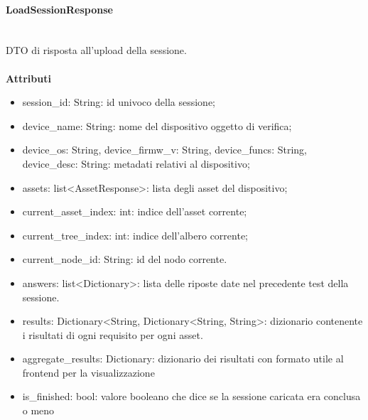 \documentclass[a4paper,12pt]{article}
\begin{document}
                \paragraph{LoadSessionResponse}\mbox{}\\
                    DTO di risposta all'upload della sessione.\\\\
                    \textbf{Attributi}
                    \begin{itemize}
                        \item {\ttfamily session\_id: String}: id univoco della sessione;
                        \item {\ttfamily device\_name: String}: nome del dispositivo oggetto di verifica;
                        \item {\ttfamily device\_os: String}, {\ttfamily device\_firmw\_v: String}, {\ttfamily device\_funcs: String}, {\ttfamily device\_desc: String}: metadati relativi al dispositivo;
                        \item {\ttfamily assets: list<AssetResponse>}: lista degli asset del dispositivo;
                        \item {\ttfamily current\_asset\_index: int}: indice dell'asset corrente;
                        \item {\ttfamily current\_tree\_index: int}: indice dell'albero corrente;
                        \item {\ttfamily current\_node\_id: String}: id del nodo corrente.
                        \item {\ttfamily answers: list<Dictionary>}: lista delle riposte date nel precedente test della sessione.
                        \item {\ttfamily results: Dictionary<String, Dictionary<String, String>}: dizionario contenente i risultati di ogni requisito per ogni asset. 
                        \item {\ttfamily aggregate\_results: Dictionary}: dizionario dei risultati con formato utile al frontend per la visualizzazione
                        \item {\ttfamily is\_finished: bool}: valore booleano che dice se la sessione caricata era conclusa o meno
                    \end{itemize}
\end{document}
